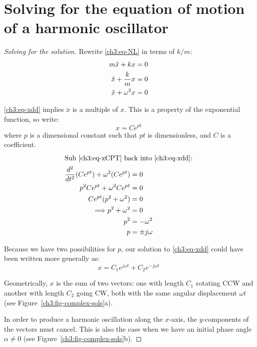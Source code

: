 \documentclass[11pt,letterpaper,titlepage,oneside]{book}
\begin{document}
\section{Solving for the equation of motion of a harmonic oscillator}

\begin{proof}[Solving for the solution]
Rewrite \eqref{ch3:eq-NL} in terms of $k/m$:
\begin{align}
m\ddot{x} + kx &= 0 \notag\\
\ddot{x} + \frac{k}{m}x &= 0 \notag\\
\ddot{x} + \omega^2 x  &= 0 \label{ch3:eq-xdd}
\end{align}

\eqref{ch3:eq-xdd} implies $\ddot{x}$ is a multiple of $x$. This is a property of the exponential function, so write: 
\begin{equation}
	x=Ce^{pt} \label{ch3:eq-xCPT}
\end{equation}
where $p$ is a dimensional constant such that $pt$ is dimensionless, and $C$ is a coefficient.
%
\begin{align*}
\intertext{Sub \eqref{ch3:eq-xCPT} back into \eqref{ch3:eq-xdd}:}
\frac{d^2}{dt^2}(Ce^{pt})+\omega^2(Ce^{pt}) &= 0\\
p^2Ce^{pt}+\omega^2Ce^{pt}&=0 \\
Ce^{pt}(p^2+\omega^2) &=0 \\
\Longrightarrow p^2 + \omega^2 &= 0 \\
p^2 &= -\omega^2 \\
p &= \pm j\omega
\end{align*}

Because we have two possibilities for $p$, our solution to \eqref{ch3:eq-xdd} could have been written more generally as:
\[ x = C_1e^{j\omega t}+C_2e^{-j\omega t} \]


Geometrically, $x$ is the sum of two vectors: one with length $C_1$ rotating CCW and another with length $C_2$ going CW, both with the same angular displacement $\omega t$ (see Figure~\ref{ch3:fig-complex-sols}a).

In order to produce a harmonic oscillation along the $x$-axis, the $y$-components of the vectors must cancel. This is also the case when we have an initial phase angle $\alpha\neq 0$ (see Figure~\ref{ch3:fig-complex-sols}b).


\end{proof}
\end{document}
